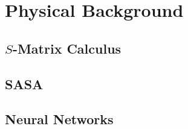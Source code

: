 \section{Physical Background}

\subsection{$S$-Matrix Calculus} \label{sec:s_mats}

\clearpage

\subsection{SASA}\label{sec:SASA}

\clearpage

\subsection{Neural Networks} \label{sec:NN_bg}

